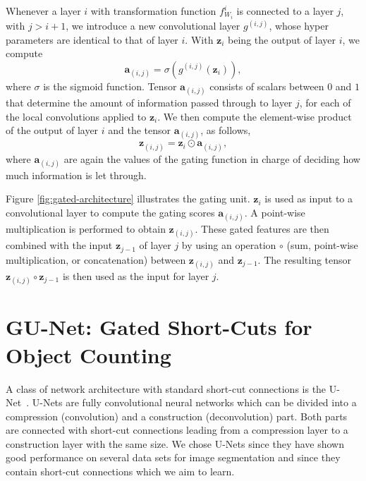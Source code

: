 \documentclass{bmvc2k}
\def\ie{\emph{i.e}\bmvaOneDot}
\begin{document}
Whenever a layer $i$ with transformation function $f^{i}_{W_i}$ is connected to a layer $j$, with $j > i + 1$, we introduce a new convolutional layer $g^{(i,j)}$, whose hyper parameters are identical to that of layer $i$. With $\boldsymbol{z}_i$ being the output of layer $i$, we compute 
\begin{equation}
\label{eq:gated_op}
\boldsymbol{a}_{(i,j)} = \sigma(g^{(i,j)}(\boldsymbol{z}_{i})),
\end{equation} 
where $\sigma$ is the sigmoid function. Tensor $\boldsymbol{a}_{(i,j)}$ consists of scalars between $0$ and $1$ that determine the amount of information passed through to layer $j$, for each of the local convolutions applied to $\boldsymbol{z}_{i}$. We then compute the element-wise product of the output of layer $i$ and the tensor $\boldsymbol{a}_{(i,j)}$, as follows,
\begin{equation}
\label{eq:gated_feat}
\boldsymbol{z}_{(i, j)} = \boldsymbol{z}_i \odot \boldsymbol{a}_{(i,j)},
\end{equation}
where $\boldsymbol{a}_{(i,j)}$ are again the values of the gating function in charge of deciding how much information is let through.

Figure \ref{fig:gated-architecture} illustrates the gating unit. $\boldsymbol{z}_i$ is used as input to a convolutional layer to compute the gating scores $\boldsymbol{a}_{(i,j)}$. A point-wise multiplication is performed to obtain $\boldsymbol{z}_{(i,j)}$. These gated features are then combined with the input $\boldsymbol{z}_{j-1}$ of layer $j$ by using an operation $\circ$ (sum, point-wise multiplication, or concatenation) between $\boldsymbol{z}_{(i,j)}$ and $\boldsymbol{z}_{j-1}$. The resulting tensor $\boldsymbol{z}_{(i,j)} \circ \boldsymbol{z}_{j-1}$ is then used as the input for layer $j$.

\section{GU-Net: Gated Short-Cuts for Object Counting}\label{sec:counting_model}%

A class of network architecture with standard short-cut connections is the U-Net~\cite{unetRonnebergerFB15}. U-Nets are fully convolutional neural networks which can be divided into a compression (convolution) and a construction (deconvolution) part. Both parts are connected with short-cut connections leading from a compression layer to a construction layer with the same size. We chose U-Nets since they have shown good performance on several data sets for image segmentation and since they contain short-cut connections which we aim to learn. 
\end{document}
